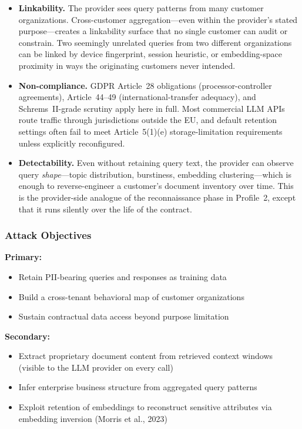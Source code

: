 \documentclass[11pt,a4paper]{report}
\begin{document}
\begin{prosebox}
\begin{itemize}[leftmargin=1.4em, itemsep=5pt]
  \item \textbf{Linkability.} The provider sees query patterns from many
        customer organizations. Cross-customer aggregation---even within
        the provider's stated purpose---creates a linkability surface that
        no single customer can audit or constrain. Two seemingly unrelated
        queries from two different organizations can be linked by device
        fingerprint, session heuristic, or embedding-space proximity in
        ways the originating customers never intended.
  \item \textbf{Non-compliance.} GDPR Article~28 obligations
        (processor-controller agreements), Article~44--49
        (international-transfer adequacy), and Schrems~II-grade scrutiny
        apply here in full. Most commercial LLM APIs route traffic through
        jurisdictions outside the EU, and default retention settings often
        fail to meet Article~5(1)(e) storage-limitation requirements
        unless explicitly reconfigured.
  \item \textbf{Detectability.} Even without retaining query text, the
        provider can observe query \emph{shape}---topic distribution,
        burstiness, embedding clustering---which is enough to reverse-engineer
        a customer's document inventory over time. This is the
        provider-side analogue of the reconnaissance phase in Profile~2,
        except that it runs silently over the life of the contract.
\end{itemize}
\end{prosebox}

\subsubsection{Attack Objectives}

\begin{prosebox}
\textbf{Primary:}
\begin{itemize}[leftmargin=1.4em, itemsep=2pt]
  \item Retain PII-bearing queries and responses as training data
  \item Build a cross-tenant behavioral map of customer organizations
  \item Sustain contractual data access beyond purpose limitation
\end{itemize}
\textbf{Secondary:}
\begin{itemize}[leftmargin=1.4em, itemsep=2pt]
  \item Extract proprietary document content from retrieved context windows
        (visible to the LLM provider on every call)
  \item Infer enterprise business structure from aggregated query patterns
  \item Exploit retention of embeddings to reconstruct sensitive attributes
        via embedding inversion (Morris et al., 2023)
\end{itemize}
\end{prosebox}
\end{document}
